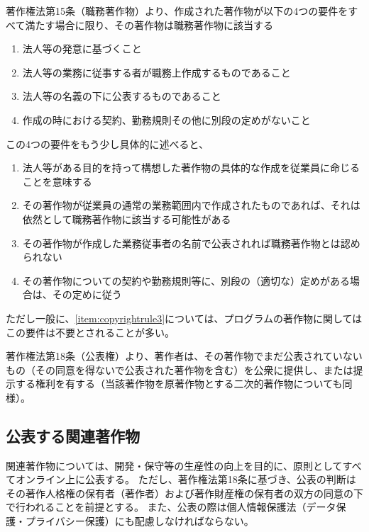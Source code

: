 \clearpage
著作権法第15条（職務著作物）より、作成された著作物が以下の4つの要件をすべて満たす場合に限り、その著作物は職務著作物に該当する
\begin{enumerate}[label=\Roman*, ref=\Roman*]
\item 法人等の発意に基づくこと
\item 法人等の業務に従事する者が職務上作成するものであること
\item\label{item:copyrightrule3} 法人等の名義の下に公表するものであること
\item 作成の時における契約、勤務規則その他に別段の定めがないこと
\end{enumerate}
この4つの要件をもう少し具体的に述べると、
\begin{enumerate}[label=\Roman*$'$]
\item 法人等がある目的を持って構想した著作物の具体的な作成を従業員に命じることを意味する
\item その著作物が従業員の通常の業務範囲内で作成されたものであれば、それは依然として職務著作物に該当する可能性がある
\item その著作物が作成した業務従事者の名前で公表されれば職務著作物とは認められない
\item その著作物についての契約や勤務規則等に、別段の（適切な）定めがある場合は、その定めに従う
\end{enumerate}
ただし一般に、\ref{item:copyrightrule3}{}については、プログラムの著作物に関してはこの要件は不要とされることが多い。



著作権法第18条（公表権）より、著作者は、その著作物でまだ公表されていないもの（その同意を得ないで公表された著作物を含む）を公衆に提供し、または提示する権利を有する（当該著作物を原著作物とする二次的著作物についても同様）。


\subsection{公表する関連著作物}
関連著作物については、開発・保守等の生産性の向上を目的に、原則としてすべてオンライン上に公表する。
ただし、著作権法第18条に基づき、公表の判断はその著作人格権の保有者（著作者）および著作財産権の保有者の双方の同意の下で行われることを前提とする。
また、公表の際は個人情報保護法（データ保護・プライバシー保護）にも配慮しなければならない。

